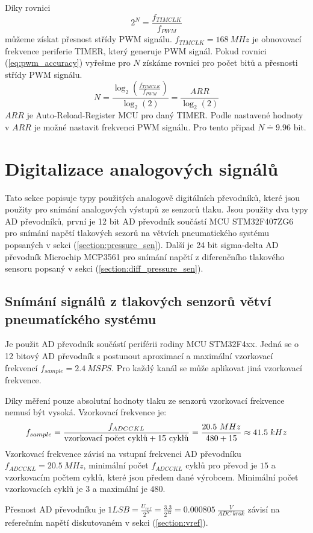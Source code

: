 \par
Díky rovnici
\begin{equation} \label{eq:pwm_accuracy}
    2^N = \frac{f_{TIMCLK}}{f_{PWM}}
\end{equation}
můžeme získat přesnost střídy PWM signálu. $f_{TIMCLK} = 168 \ MHz$ je obnovovací frekvence periferie TIMER, který generuje PWM signál. Pokud rovnici (\ref{eq:pwm_accuracy}) vyřešme pro $N$ získáme rovnici pro počet bitů a přesnosti střídy PWM signálu.
\begin{equation}
    N = \frac{\log_{2} (\frac{f_{TIMCLK}}{f_{PWM}})}{\log_{2}(2)} = \frac{ARR}{\log_{2}(2)}
\end{equation}
$ARR$ je Auto-Reload-Register MCU pro daný TIMER. Podle nastavené hodnoty v $ARR$ je možné nastavit frekvenci PWM signálu. Pro tento připad $N \doteq 9.96 $ bit.

\section{Digitalizace analogových signálů}
Tato sekce popisuje typy použitých analogově digitálních převodníků, které jsou použity pro snímání analogových výstupů ze senzorů tlaku. Jsou použity dva typy AD převodníků, první je 12 bit AD převodník součástí MCU STM32F407ZG6 pro snímání napětí tlakových sezorů na větvích pneumatického systému popsaných v sekci (\ref{section:pressure_sen}).
Další je 24 bit sigma-delta AD převodník Microchip MCP3561 pro snímání napětí z diferenčního tlakového sensoru popsaný v sekci (\ref{section:diff_pressure_sen}).

\subsection{Snímání signálů z tlakových senzorů větví pneumatíckého systému}
Je použit AD převodník součástí periférii rodiny MCU STM32F4xx. Jedná se o 12 bitový AD převodník s postunout aproximací a maximální vzorkovací frekvencí $f_{sample} = 2.4 \ MSPS$. Pro každý kanál se může aplikovat jiná vzorkovací frekvence. \par
Díky měření pouze absolutní hodnoty tlaku ze senzorů vzorkovací frekvence nemusí být vysoká. Vzorkovací frekvence je:
\begin{equation}
    f_{sample}=\frac{f_{ADCCKL}}{\textnormal{vzorkovací počet cyklů} + 15 \ \textnormal{cyklů} } = \frac{20.5 \ MHz}{480 + 15} \approx 41.5 \; kHz
\end{equation}
Vzorkovací frekvence závisí na vstupní frekvenci AD převodníku $f_{ADCCKL} = 20.5 \ MHz$, minimální počet $f_{ADCCKL} $ cyklů pro převod je $15$ a vzorkovacím počtem cyklů, které jsou předem dané výrobcem. Minimální počet vzorkovacích cyklů je $3$ a maximální je $480$.
\par
Přesnost AD převodníku je $1 LSB = \frac{U_{ref}}{2^N} = \frac{3.3}{2^{12}} = 0.000805 \ \frac{V}{ADC \ krok}$ závisí na referečním napětí diskutovaném v sekci (\ref{section:vref}).

